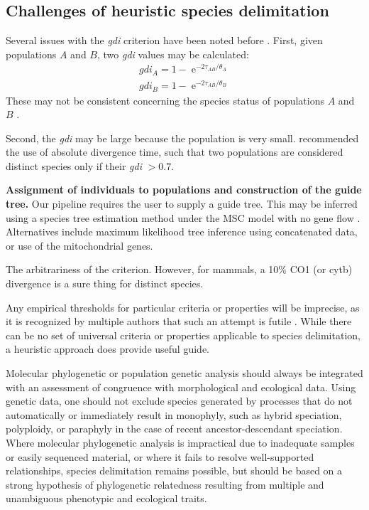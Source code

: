 \documentclass[A4]{article1}
\DeclareMathOperator{\e}{\mathrm{e}}
\begin{document}
\subsection{Challenges of heuristic species delimitation}

Several issues with the \textit{gdi} criterion have been noted before \citep{Leache2019}.  
First, given populations $A$ and $B$, two \textit{gdi} values may be calculated:
\begin{equation}
   \begin{aligned}
      gdi_A = 1 - \e^{-2\tau _{AB}/\theta_A} \\
      gdi_B = 1 - \e^{-2\tau _{AB}/\theta_B}
   \end{aligned}
\end{equation}
These may not be consistent concerning the species status of populations $A$ and $B$
\citep{Leache2019}.

Second, the \textit{gdi} may be large because the population is very small.
\citet{Rannala2020} recommended the use of absolute divergence time, such that two
populations are considered distinct species only if their \textit{gdi} $> 0.7$.

\textbf{Assignment of individuals to populations and construction of the guide tree.}
Our pipeline requires the user to supply a guide tree.  This may be inferred using a
species tree estimation method under the MSC model with no gene flow \citep{Yang2014,
   Rannala2017}.  Alternatives include maximum likelihood tree inference using concatenated
data, or use of the mitochondrial genes.

The arbitrariness of the criterion.  However, for mammals, a 10\% CO1 (or cytb)
divergence is a sure thing for distinct species.

Any empirical thresholds for particular criteria or properties will be imprecise, as it
is recognized by multiple authors that such an attempt is futile \cite{Wells2022}. While
there can be no set of universal criteria or properties applicable to species
delimitation, a heuristic approach does provide useful guide.

Molecular phylogenetic or population genetic analysis should always be integrated with
an assessment of congruence with morphological and ecological data.  Using genetic data,
one should not exclude species generated by processes that do not automatically or
immediately result in monophyly, such as hybrid speciation, polyploidy, or paraphyly in
the case of recent ancestor-descendant speciation.  Where molecular phylogenetic
analysis is impractical due to inadequate samples or easily sequenced material, or where
it fails to resolve well-supported relationships, species delimitation remains possible,
but should be based on a strong hypothesis of phylogenetic relatedness resulting from
multiple and unambiguous phenotypic and ecological traits.
\end{document}
